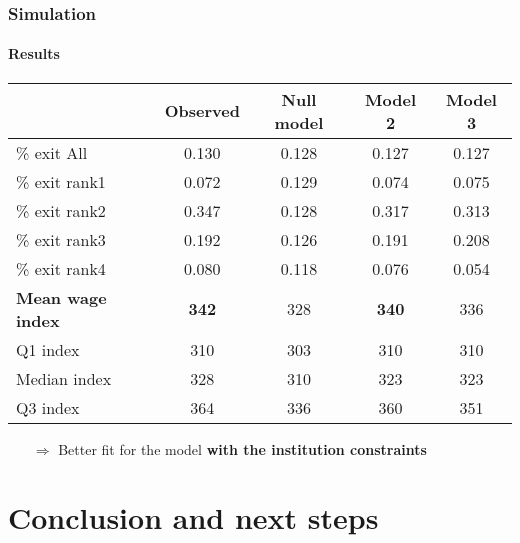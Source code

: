 \documentclass[xcolor=table,ignorenonframetext,12pt]{beamer}
\newenvironment{choixmarges}[2]{\begin{list}{}{%
\setlength{\topsep}{0pt}%
\setlength{\leftmargin}{0pt}%
\setlength{\rightmargin}{0pt}%
\setlength{\listparindent}{\parindent}%
\setlength{\itemindent}{\parindent}%
\setlength{\parsep}{0pt plus 1pt}%
\addtolength{\leftmargin}{#1}%
\addtolength{\rightmargin}{#2}%
}\item }{\end{list}}
\begin{document}
\begin{frame}
\frametitle{Simulation}
\framesubtitle{Results}
\begin{choixmarges}{-0.5cm}{-0.5cm}

\begin{table}[ht]
\centering
\begingroup\footnotesize
\begin{tabular}{lcccc}
  \toprule
 & Observed & Null model & Model 2 & Model 3 \\ 
  \midrule
\% exit All & 0.130 & 0.128 & 0.127 & 0.127 \\ 
\% exit rank1 & 0.072 & 0.129 & 0.074 & 0.075 \\ 
\% exit rank2 & 0.347 & 0.128 & 0.317 & 0.313 \\ 
  \% exit rank3 & 0.192 & 0.126 & 0.191 & 0.208 \\ 
  \% exit rank4 & 0.080 & 0.118 & 0.076 & 0.054 \\ 
   \midrule
     \textbf{Mean wage index }& \textbf{342} & 328 & \textbf{340} & 336 \\ 
  Q1 index & 310 & 303 & 310 & 310 \\ 
  Median index & 328 & 310 & 323 & 323 \\ 
  Q3 index & 364 & 336 & 360 & 351 \\ 
 \bottomrule 
\end{tabular}
\endgroup
\end{table}

\vspace{0.2cm}
\begin{itemize}
\item[$\Rightarrow$] Better fit for the model \textbf{with the institution constraints}

\end{itemize}


\end{choixmarges}

\end{frame}



\section{Conclusion and next steps}
\end{document}

